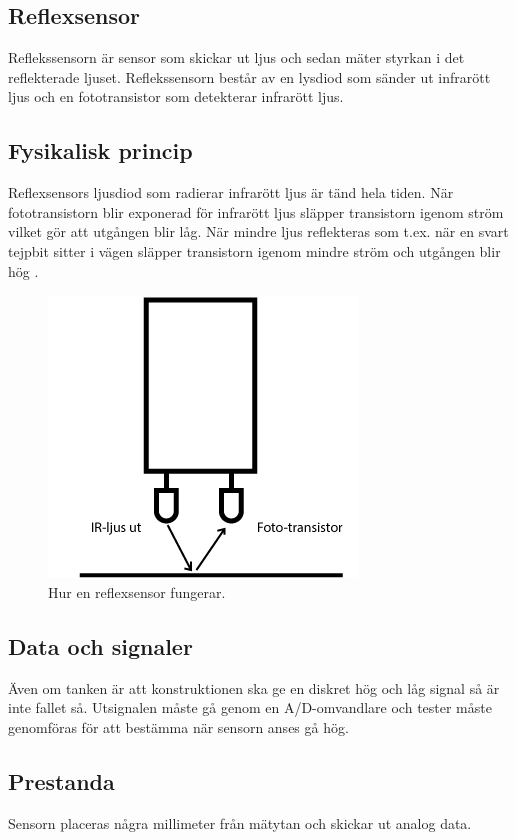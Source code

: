 \documentclass[11pt]{article}
\begin{document}
\begin{flushleft}
\pagebreak 
 
\section{Reflexsensor}
Reflekssensorn är sensor som skickar ut ljus och sedan mäter styrkan i det reflekterade ljuset. Reflekssensorn består av en lysdiod som sänder ut infrarött ljus och en fototransistor som detekterar infrarött ljus.

 \subsection{Fysikalisk princip}
Reflexsensors ljusdiod som radierar infrarött ljus är tänd hela tiden. När fototransistorn blir exponerad för infrarött ljus släpper transistorn igenom ström vilket gör att utgången blir låg. När mindre ljus reflekteras som t.ex. när en svart tejpbit sitter i vägen släpper transistorn igenom mindre ström och utgången blir hög \autocite{vanheden_reflex}. 

\begin{figure}[H]
\centering
\includegraphics[scale=0.5]{Reflexsensor}
\caption{Hur en reflexsensor fungerar.}
\label{fig:reflex}
\end{figure}
 
\subsection{Data och signaler}
Även om tanken är att konstruktionen ska ge en diskret hög och låg signal så är inte fallet så. Utsignalen måste gå genom en A/D-omvandlare och tester måste genomföras för att bestämma när sensorn anses gå hög.
 
\subsection{Prestanda}
Sensorn placeras några millimeter från mätytan och skickar ut analog data.


\end{flushleft}
\end{document}
